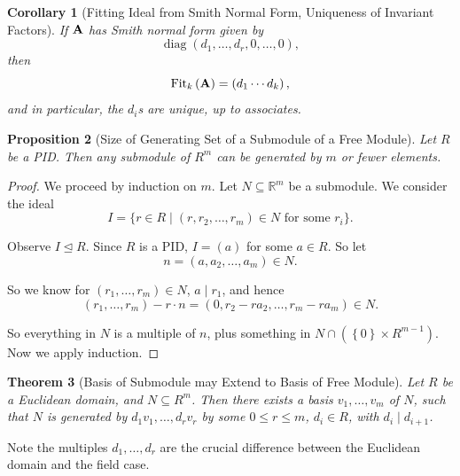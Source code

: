 \documentclass{article}
\newtheorem{theorem}{Theorem}[section]
\newtheorem{proposition}[theorem]{Proposition}
\newtheorem{corollary}[theorem]{Corollary}
\theoremstyle{definition}
\theoremstyle{remark}
\newcommand{\pqty}[1]{\left(#1\right)}
\newcommand{\Bqty}[1]{\left\{#1\right\}}
\newcommand{\set}[2]{\{#1\mid #2\}}
\newcommand{\submodule}{\subseteq}
\newcommand{\idealsub}{\trianglelefteq}
\newcommand{\divides}{\mid}
\newcommand{\RR}{\mathbb{R}}
\newcommand{\Fit}{\operatorname{Fit}}
\newcommand{\diag}{\operatorname{diag}}
\begin{document}
\begin{corollary}[Fitting Ideal from Smith Normal Form, Uniqueness of Invariant Factors]
    \label{cor:fit-ideal-snf-uniqueness-if}%
    If \(\vb{A}\) has Smith normal form given by
    \[
        \diag\pqty{d_1, \ldots, d_r, 0, \ldots, 0},
    \]
    then
    \[
        \Fit_k \pqty{\vb{A}} = \pqty{d_1 \cdots d_k},
    \]
    and in particular, the \(d_i\)s are unique, up to associates.
\end{corollary}

\begin{proposition}[Size of Generating Set of a Submodule of a Free Module]
    \label{prop:size-generating-set-free-module}%
    Let \(R\) be a PID. Then any submodule of \(R^m\) can be generated by \(m\) or fewer elements.
\end{proposition}

\begin{proof}
    We proceed by induction on \(m\). Let \(N \submodule \RR^m\) be a submodule. We consider the ideal
    \[
        I = \set{r \in R}{\pqty{r, r_2, \ldots, r_m} \in N \text{ for some }r_i}.
    \]

    Observe \(I \idealsub R\). Since \(R\) is a PID, \(I = \pqty{a}\) for some \(a \in R\). So let
    \[
        n = \pqty{a, a_2, \ldots, a_m} \in N.
    \]

    So we know for \(\pqty{r_1, \ldots, r_m} \in N\), \(a \divides r_1\), and hence
    \[
        \pqty{r_1, \ldots, r_m} - r \cdot n = \pqty{0, r_2 - r a_2, \ldots, r_m - r a_m} \in N.
    \]

    So everything in \(N\) is a multiple of \(n\), plus something in \(N \cap \pqty{\Bqty{0} \times R^{m - 1}}\). Now we apply induction.
\end{proof}

\begin{theorem}[Basis of Submodule may Extend to Basis of Free Module]
    \label{thm:basis-submodule-extend-space}%
    Let \(R\) be a Euclidean domain, and \(N \submodule R^m\). Then there exists a basis \(v_1, \ldots, v_m\) of \(N\), such that \(N\) is generated by \(d_1 v_1, \ldots, d_r v_r\) by some \(0 \leq r \leq m\), \(d_i \in R\), with \(d_i \divides d_{i + 1}\).
\end{theorem}

Note the multiples \(d_1, \ldots, d_r\) are the crucial difference between the Euclidean domain and the field case.
\end{document}
